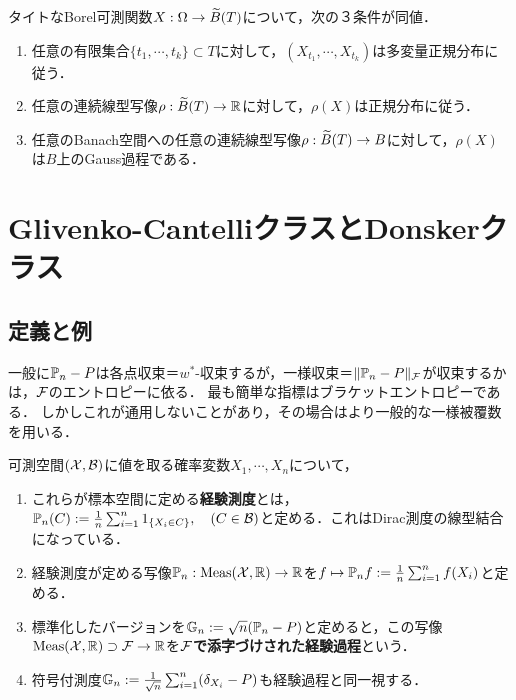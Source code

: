 \documentclass[uplatex,dvipdfmx]{jsreport}
\begin{document}
\begin{proposition}
    タイトなBorel可測関数$X:\Omega\to\widetilde{B}(T)$について，次の３条件が同値．
    \begin{enumerate}
        \item 任意の有限集合$\{t_1,\cdots,t_k\}\subset T$に対して，$(X_{t_1},\cdots,X_{t_k})$は多変量正規分布に従う．
        \item 任意の連続線型写像$\rho:\widetilde{B}(T)\to\mathbb{R}$に対して，$\rho(X)$は正規分布に従う．
        \item 任意のBanach空間への任意の連続線型写像$\rho:\widetilde{B}(T)\to B$に対して，$\rho(X)$は$B$上のGauss過程である．
    \end{enumerate}
\end{proposition}

\section{Glivenko-CantelliクラスとDonskerクラス}

\subsection{定義と例}

\begin{tcolorbox}[colframe=ForestGreen, colback=ForestGreen!10!white,breakable,colbacktitle=ForestGreen!40!white,coltitle=black,fonttitle=\bfseries\sffamily,
title=]
    一般に$\mathbb{P}_n-P$は各点収束＝$w^*$-収束するが，一様収束＝$\|\mathbb{P}_n-P\|_{\mathcal{F}}$が収束するかは，$\mathcal{F}$のエントロピーに依る．
    最も簡単な指標はブラケットエントロピーである．
    しかしこれが通用しないことがあり，その場合はより一般的な一様被覆数を用いる．
\end{tcolorbox}

\begin{definition}
    可測空間$(\mathcal{X},\mathcal{B})$に値を取る確率変数$X_1,\cdots,X_n$について，
    \begin{enumerate}
        \item これらが標本空間に定める\textbf{経験測度}とは，$\mathbb{P}_n(C):=\frac{1}{n}\sum^n_{i=1}1_{\left\{X_i\in C\right\}},\quad(C\in\mathcal{B})$と定める．これはDirac測度の線型結合になっている．
        \item 経験測度が定める写像$\mathbb{P}_n:\mathrm{Meas}(\mathcal{X},\mathbb{R})\to\mathbb{R}$を$f\mapsto\mathbb{P}_nf:=\frac{1}{n}\sum^n_{i=1}f(X_i)$と定める．
        \item 標準化したバージョンを$\mathbb{G}_n:=\sqrt{n}(\mathbb{P}_n-P)$と定めると，この写像$\mathrm{Meas}(\mathcal{X},\mathbb{R})\supset\mathcal{F}\to\mathbb{R}$を\textbf{$\mathcal{F}$で添字づけされた経験過程}という．
        \item 符号付測度$\mathbb{G}_n:=\frac{1}{\sqrt{n}}\sum_{i=1}^n(\delta_{X_i}-P)$も経験過程と同一視する．
    \end{enumerate}
\end{definition}
\end{document}
